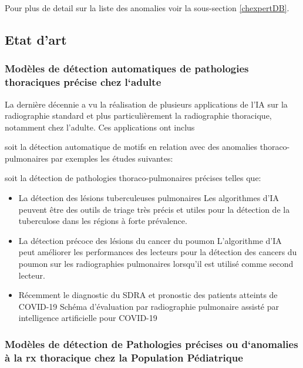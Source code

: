                 Pour plus de detail sur la liste des anomalies voir la sous-section \ref{chexpertDB}.

        \subsection{Etat d'art}
            \subsubsection{Modèles de détection automatiques de pathologies thoraciques précise chez l‘adulte}
            La dernière décennie a vu la réalisation de plusieurs applications de l'IA sur la radiographie standard et plus particulièrement la radiographie thoracique, notamment chez l'adulte.
            Ces applications ont inclus 
            
            soit la détection automatique de motifs en relation avec des anomalies thoraco-pulmonaires par exemples les études suivantes:
            
            soit la détection de pathologies thoraco-pulmonaires précises telles que:
            
            \begin{itemize}[label=$\bullet$]
                \item La détection des lésions tuberculeuses pulmonaires
                \hspace*{1cm}Les algorithmes d'IA peuvent être des outils de triage très précis et utiles pour la détection de la tuberculose dans les régions à forte prévalence.
                \item La détection précoce des lésions du cancer du poumon
                \hspace*{1cm}L'algorithme d'IA peut améliorer les performances des lecteurs pour la détection des cancers du poumon sur les radiographies pulmonaires lorsqu'il est utilisé comme second lecteur.
                \item Récemment le diagnostic du SDRA et pronostic des patients atteints de COVID-19
                \hspace*{1cm}Schéma d'évaluation par radiographie pulmonaire assisté par intelligence artificielle pour COVID-19
            \end{itemize}

            \subsubsection{Modèles de détection de Pathologies précises ou d‘anomalies à la rx thoracique chez la Population Pédiatrique}

